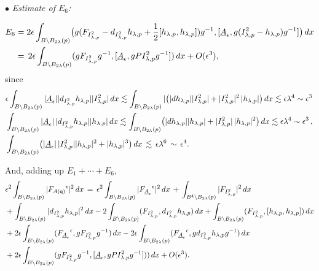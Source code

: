 \documentclass[11pt]{article}
\numberwithin{equation}{section} \setlength{\topmargin}{-35pt}
\newcommand{\q}{\mathsf{q}}
\begin{document}
\noindent $\bullet$ \emph{Estimate of $E_6$:}

\begin{align}
  E_6&=2\epsilon\int_{B\setminus B_{2\lambda}(p)}\bigl(g(F_{I^2_{\lambda,p}}-d_{I^2_{\lambda,p}}h_{\lambda,p}+
\frac{1}{2}[h_{\lambda,p},h_{\lambda,p}])g^{-1},[\underline A_\epsilon ,g(I^2_{\lambda,p}-h_{\lambda,p})g^{-1}]\bigr)\,dx\notag\\
&=\,2\epsilon\int_{B\setminus
B_{2\lambda}(p)}(gF_{I^2_{\lambda,p}}g^{-1},[\underline
A_\epsilon,gPI^2_{\lambda,p}g^{-1}])\,dx+O(\epsilon^3),\notag
\end{align}
\noindent since
\begin{align}
 &\epsilon\int_{B\setminus B_{2\lambda}(p)}|\underline A_\epsilon
||d_{I^2_{\lambda,p}}h_{\lambda,p}||I^2_{\lambda,p}| \,dx\lesssim
\int_{B\setminus B_{2\lambda}(p)}|\bigl(|d
h_{\lambda,p}||I^2_{\lambda,p}| + |I^2_{\lambda,p}|^2\,
|h_{\lambda,p}|\bigr)\,dx \lesssim \epsilon \lambda^4 \sim
\epsilon^3\,\notag\\
&\int_{B\setminus B_{2\lambda}(p)}|\underline A_\epsilon
|\,|d_{I^2_{\lambda,p}}h_{\lambda,p}||h_{\lambda,p}|\,dx\lesssim
\int_{B\setminus
B_{2\lambda}(p)}\bigl(|dh_{\lambda,p}||h_{\lambda,p}|+|I^2_{\lambda,p}|\,|h_{\lambda,p}|^2\bigr)\,dx
\lesssim \epsilon\lambda^4\sim \epsilon^3\,,\notag\\
&\int_{B\setminus B_{2\lambda}(p)}\bigl(|\underline A_\epsilon |\,
|I^2_{\lambda,p}||h_{\lambda,p}|^2 +
|h_{\lambda,p}|^3\bigr)\,dx\,\lesssim\,\epsilon\lambda^6\,\sim\,
\epsilon^4. \notag
\end{align}

\noindent And, adding up $E_1+\cdots + E_6,$
\begin{align}
\label{YM1-I}   &\epsilon^2 \int_{B\setminus
B_{2\lambda}(p)}|{F_{A(\q)}}^{\epsilon}|^2\,dx\,=\,
\epsilon^2\int_{B\setminus
B_{2\lambda}(p)}|{F_{\underline{A}_{\epsilon}}}^{\epsilon}|^2\,dx\,+\,
\int_{B^4\setminus B_{2\lambda}(p)}|F_{I^2_{\lambda,p}}|^2\,dx\notag\\
   &+\int_{B\setminus
B_{2\lambda}(p)}|d_{I^2_{\lambda,p}}h_{\lambda,p}|^2\,dx
-2\int_{B\setminus
B_{2\lambda}(p)}(F_{I^2_{\lambda,p}},d_{I^2_{\lambda,p}}h_{\lambda,p})\,dx+\int_{B\setminus
B_{2\lambda}(p)}(F_{I^2_{\lambda,p}},[h_{\lambda,p},h_{\lambda,p}])\,dx\notag\\
   &+2\epsilon\int_{B\setminus B_{2\lambda}(p)}({F_{\underline
A_\epsilon}}^{\epsilon},gF_{I^2_{\lambda,p}}g^{-1})\,dx-2\epsilon\int_{B\setminus
B_{2\lambda}(p)}({F_{\underline A_\epsilon}}^{\epsilon},
gd_{I^2_{\lambda,p}}h_{\lambda,p}g^{-1})\,dx\notag\\
   &+2\epsilon\int_{B\setminus
B_{2\lambda}(p)}(gF_{I^2_{\lambda,p}}g^{-1},[\underline A_\epsilon
,gPI^2_{\lambda,p}g^{-1}]))\,dx+O(\epsilon^3).
\end{align}
\end{document}

